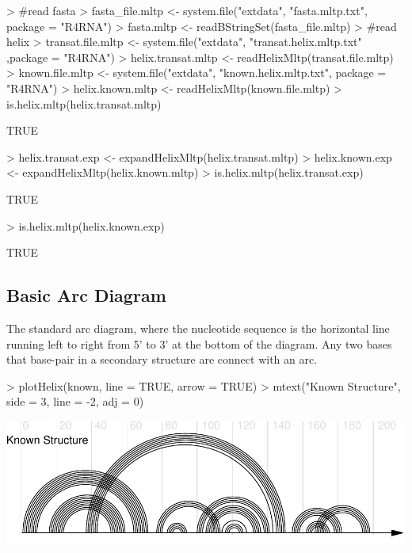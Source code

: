 \documentclass[letterpaper]{article}
\begin{document}
\begin{Schunk}
\begin{Sinput}
> #read fasta
> fasta_file.mltp <- system.file("extdata", "fasta.mltp.txt", package = "R4RNA")
> fasta.mltp <- readBStringSet(fasta_file.mltp)
> #read helix
> transat.file.mltp <- system.file("extdata", "transat.helix.mltp.txt" ,package = "R4RNA")
> helix.transat.mltp <- readHelixMltp(transat.file.mltp)
> known.file.mltp <- system.file("extdata", "known.helix.mltp.txt", package = "R4RNA")
> helix.known.mltp <- readHelixMltp(known.file.mltp)
> is.helix.mltp(helix.transat.mltp)
\end{Sinput}
\begin{Soutput}
[1] TRUE
\end{Soutput}
\begin{Sinput}
> helix.transat.exp <- expandHelixMltp(helix.transat.mltp)
> helix.known.exp <- expandHelixMltp(helix.known.mltp)
> is.helix.mltp(helix.transat.exp)
\end{Sinput}
\begin{Soutput}
[1] TRUE
\end{Soutput}
\begin{Sinput}
> is.helix.mltp(helix.known.exp)
\end{Sinput}
\begin{Soutput}
[1] TRUE
\end{Soutput}
\end{Schunk}


\subsection{Basic Arc Diagram}

The standard arc diagram, where the nucleotide sequence is the horizontal
line running left to right from 5' to 3' at the bottom of the diagram.  Any
two bases that base-pair in a secondary structure are connect with an arc.

\begin{Schunk}
\begin{Sinput}
> plotHelix(known, line = TRUE, arrow = TRUE)
> mtext("Known Structure", side = 3, line = -2, adj = 0)
\end{Sinput}
\end{Schunk}
\includegraphics{R4RNA-003}
\end{document}
